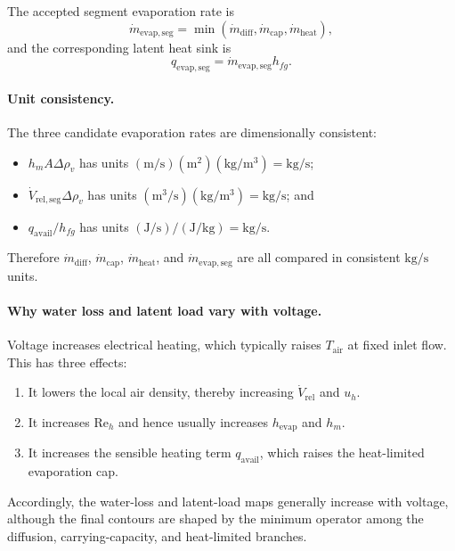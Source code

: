 \documentclass{article}
\begin{document}
The accepted segment evaporation rate is
\begin{equation}
\dot{m}_{\mathrm{evap,seg}}
= \min\!\left(
\dot{m}_{\mathrm{diff}},
\dot{m}_{\mathrm{cap}},
\dot{m}_{\mathrm{heat}}
\right),
\end{equation}
and the corresponding latent heat sink is
\begin{equation}
q_{\mathrm{evap,seg}}
= \dot{m}_{\mathrm{evap,seg}} h_{fg}.
\end{equation}

\paragraph*{Unit consistency.}
The three candidate evaporation rates are dimensionally consistent:
\begin{itemize}
\item $h_m A \Delta \rho_v$ has units
      $(\mathrm{m/s})(\mathrm{m^2})(\mathrm{kg/m^3})=\mathrm{kg/s}$;
\item $\dot{V}_{\mathrm{rel,seg}} \Delta \rho_v$ has units
      $(\mathrm{m^3/s})(\mathrm{kg/m^3})=\mathrm{kg/s}$; and
\item $q_{\mathrm{avail}}/h_{fg}$ has units
      $(\mathrm{J/s})/(\mathrm{J/kg})=\mathrm{kg/s}$.
\end{itemize}
Therefore $\dot{m}_{\mathrm{diff}}$, $\dot{m}_{\mathrm{cap}}$,
$\dot{m}_{\mathrm{heat}}$, and $\dot{m}_{\mathrm{evap,seg}}$ are all
compared in consistent $\mathrm{kg/s}$ units.

\paragraph*{Why water loss and latent load vary with voltage.}
Voltage increases electrical heating, which typically raises
$T_{\mathrm{air}}$ at fixed inlet flow. This has three effects:
\begin{enumerate}
\item It lowers the local air density, thereby increasing
      $\dot{V}_{\mathrm{rel}}$ and $u_h$.
\item It increases $\mathrm{Re}_h$ and hence usually increases
      $h_{\mathrm{evap}}$ and $h_m$.
\item It increases the sensible heating term $q_{\mathrm{avail}}$, which
      raises the heat-limited evaporation cap.
\end{enumerate}
Accordingly, the water-loss and latent-load maps generally increase with
voltage, although the final contours are shaped by the minimum operator among
the diffusion, carrying-capacity, and heat-limited branches.
\end{document}
